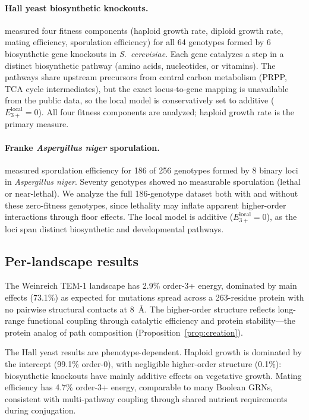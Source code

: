 \documentclass[10pt]{article}
\begin{document}
\paragraph{Hall yeast biosynthetic knockouts.}
\citet{hall2010fitness} measured four fitness components (haploid
growth rate, diploid growth rate, mating efficiency, sporulation
efficiency) for all 64 genotypes formed by 6 biosynthetic gene
knockouts in \emph{S.~cerevisiae}. Each gene catalyzes a step in a
distinct biosynthetic pathway (amino acids, nucleotides, or
vitamins). The pathways share upstream precursors from central
carbon metabolism (PRPP, TCA cycle intermediates), but the exact
locus-to-gene mapping is unavailable from the public data, so the
local model is conservatively set to additive
($E_{3+}^{\mathrm{local}} = 0$). All four fitness components are
analyzed; haploid growth rate is the primary measure.

\paragraph{Franke \emph{Aspergillus niger} sporulation.}
\citet{franke2011evolutionary} measured sporulation efficiency for
186 of 256 genotypes formed by 8 binary loci in
\emph{Aspergillus niger}. Seventy genotypes showed no measurable
sporulation (lethal or near-lethal). We analyze the full 186-genotype
dataset both with and without these zero-fitness genotypes, since
lethality may inflate apparent higher-order interactions through
floor effects. The local model is additive
($E_{3+}^{\mathrm{local}} = 0$), as the loci span distinct
biosynthetic and developmental pathways.

\subsection*{Per-landscape results}

The Weinreich TEM-1 landscape has 2.9\% order-3+ energy, dominated
by main effects (73.1\%) as expected for mutations spread across a
263-residue protein with no pairwise structural contacts at 8~\AA.
The higher-order structure reflects long-range functional coupling
through catalytic efficiency and protein stability---the protein
analog of path composition (Proposition~\ref{prop:creation}).

The Hall yeast results are phenotype-dependent. Haploid growth is
dominated by the intercept (99.1\% order-0), with negligible
higher-order structure (0.1\%): biosynthetic knockouts have mainly
additive effects on vegetative growth. Mating efficiency has 4.7\%
order-3+ energy, comparable to many Boolean GRNs, consistent with
multi-pathway coupling through shared nutrient requirements during
conjugation.
\end{document}
